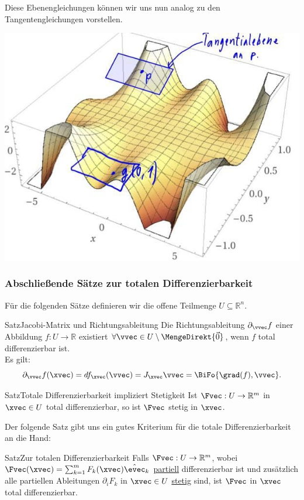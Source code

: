\begin{Beispiel}
Diese Ebenengleichungen können wir uns nun analog zu den Tangentengleichungen vorstellen.
\begin{center}
    \includegraphics[width=.45\textwidth]{Dateien/07/07Tangentialebenen.jpg}
\end{center}
\end{Beispiel}
\subsubsection{Abschließende Sätze zur totalen Differenzierbarkeit}
Für die folgenden Sätze definieren wir  die offene Teilmenge $U\subseteq \mathbb{R}^n$.
\begin{Satz}
{Satz}{Jacobi-Matrix und Richtungsableitung}
Die Richtungsableitung $\partial_\vvec f$ einer Abbildung $f:U\to\mathbb{R}$ existiert $\forall \vvec\in U\setminus\MengeDirekt{\Vec{0}}$, wenn $f$ total differenzierbar ist.\\
Es gilt:
\begin{equation}
    \partial_\vvec f(\xvec)=df_\xvec(\vvec)=J_\xvec\vvec=\BiFo{\grad(f),\vvec}.
\end{equation}
\end{Satz}
\begin{Satz}
{Satz}{Totale Differenzierbarkeit impliziert Stetigkeit}
Ist $\Fvec:U\to\mathbb{R}^m$ in $\xvec\in U$ total differenzierbar, so ist $\Fvec$ stetig in $\xvec$.
\end{Satz}
Der folgende  Satz gibt uns ein gutes Kriterium für die totale Differenzierbarkeit an die Hand:
\begin{Satz}
{Satz}{Zur totalen Differenzierbarkeit}
Falls $\Fvec:U\to\mathbb{R}^m$, wobei $\Fvec(\xvec)=\sum_{k=1}^mF_k(\xvec)\hat{\evec}_k$ \underline{partiell} differenzierbar ist und zusätzlich alle partiellen Ableitungen $\partial_iF_k$ in $\xvec\in U$ \underline{stetig} sind, ist $\Fvec$ in $\xvec$ total differenzierbar.
\end{Satz}
